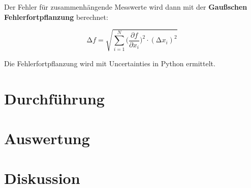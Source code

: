 Der Fehler für zusammenhängende Messwerte wird dann mit der \textbf{Gaußschen Fehlerfortpflanzung} berechnet:

\begin{equation}
    \increment{f} = \sqrt{ \sum_{i = 1}^{N}  \biggl(\frac{\partial{f}}{\partial{x_i}}\biggr)^2\cdot(\increment{x_i})^2}
    \label{eqn:Gauss}
\end{equation}

Die Fehlerfortpflanzung wird mit Uncertainties in Python \cite{uncertainties} ermittelt.


\section{Durchführung}



\section{Auswertung}



\section{Diskussion}


\newpage
\printbibliography

